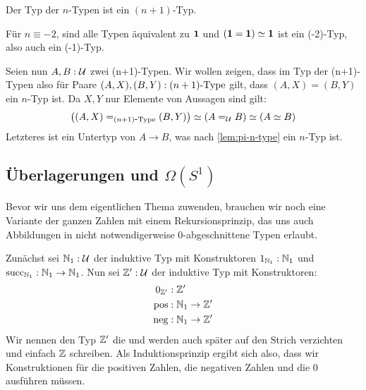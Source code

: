 \begin{bemerkung}
  \label{bem:level-of-n-typ}
  Der Typ der $n$-Typen ist ein $(n+1)$-Typ.
\end{bemerkung}
\begin{beweis}
  Für $n\equiv -2$, sind alle Typen äquivalent zu $\mathbf{1}$ und $(\mathbf{1}=\mathbf{1}) \simeq \mathbf{1}$ ist ein (-2)-Typ, also auch ein (-1)-Typ.
  
  Seien nun $A,B:\mathcal{U}$ zwei (n+1)-Typen. Wir wollen zeigen, dass im Typ der (n+1)-Typen also für Paare $(A,X),(B,Y):(n+1)\mbox{-}\mathrm{Type}$ gilt, dass $(A,X)=(B,Y)$ ein $n$-Typ ist.
  Da $X,Y$ nur Elemente von Aussagen sind gilt:
  \[
    \left((A,X)=_{(n+1)\mbox{-}\mathrm{Type}}(B,Y) \right)\simeq \left(A=_{\mathcal{U}} B\right) \simeq (A\simeq B)
  \]
  Letzteres ist ein Untertyp von $A\to B$, was nach \cref{lem:pi-n-type} ein $n$-Typ ist.
\end{beweis}

\subsection{Überlagerungen und $\Omega(S^1)$}

Bevor wir uns dem eigentlichen Thema zuwenden, brauchen wir noch eine Variante der ganzen Zahlen mit einem Rekursionsprinzip,
das uns auch Abbildungen in nicht notwendigerweise 0-abgeschnittene Typen erlaubt.

\begin{regeln}
  Zunächst sei $\mathbb{N}_1:\mathcal{U}$ der induktive Typ mit Konstruktoren $1_{\mathbb{N}_1}:\mathbb{N}_1$ und $\mathrm{succ}_{\mathbb{N}_1}:\mathbb{N}_1\to\mathbb{N}_1$.
  Nun sei $\mathbb{Z}':\mathcal{U}$ der induktive Typ mit Konstruktoren:
  \begin{align*}
    0_{\mathbb{Z}'}&:\mathbb{Z}' \\
    \mathrm{pos}&:\mathbb{N}_1\to\mathbb{Z}' \\
    \mathrm{neg}&:\mathbb{N}_1\to\mathbb{Z}'
  \end{align*}
  Wir nennen den Typ $\mathbb{Z}'$ die \index{$\Z$} und werden auch später auf den Strich verzichten und einfach $\Z$ schreiben.
  Als Induktionsprinzip ergibt sich also, dass wir Konstruktionen für die positiven Zahlen, die negativen Zahlen und die 0 ausführen müssen.
\end{regeln}

